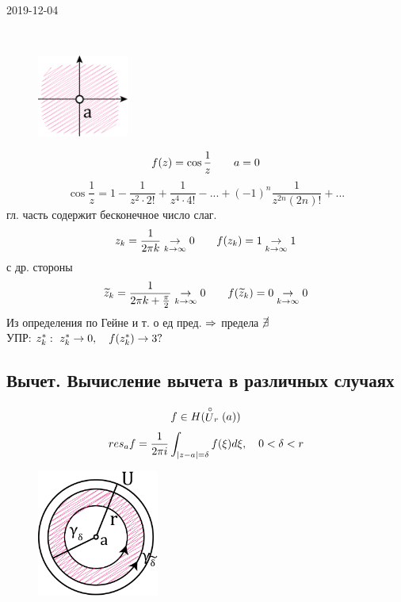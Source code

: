 \documentclass[main]{subfiles}
\begin{document}
\begin{lect}{2019-12-04}
    \begin{Example}[3 сущ. ос-ть]\
        \begin{figure}[H]
            \includegraphics[width=3cm]{pics/13_2}
            \centering
        \end{figure}
        \[f(z) = \cos \frac{1}{z} \qquad a = 0\]
        \[\cos \frac{1}{z} = 1 - \frac{1}{z^2 \cdot 2!} + \frac{1}{z^4 \cdot 4!} - ... +
        (-1)^n \frac{1}{z^{2n}(2n)! } + ...\]
        гл. часть содержит бесконечное число слаг.\\
        \[z_k = \frac{1}{2\pi k} \underset{k \to \infty}{\to } 0 \qquad f(z_k) = 1 \underset{k \to \infty}{\to } 1\]
        с др. стороны
        \[\widetilde{z}_k = \frac{1}{2\pi k + \frac{\pi}{2}} \underset{k \to \infty}{\to } 0\qquad
        f(\widetilde{z}_k) = 0 \underset{k \to \infty}{\to } 0\]
        Из определения по Гейне и т. о ед пред. $\Rightarrow $ предела $\cancel{\exists }$\\
        УПР: $z^*_k : \ z_k^* \to  0, \quad f(z_k^*) \to 3?$
    \end{Example}

    \subsection{Вычет. Вычисление вычета в различных случаях}

    \begin{Definition}
        \[f \in H(\stackrel{\circ}{U}_r(a))\]
        \[res_a f = \frac{1}{2\pi i}\int_{\left|z - a\right| = \delta} f(\xi)d\xi , \quad 0 < \delta < r \]
        \begin{figure}[H]
            \includegraphics[width=4cm]{pics/13_3}
            \centering
        \end{figure}
    \end{Definition}


\end{lect}
\end{document}
